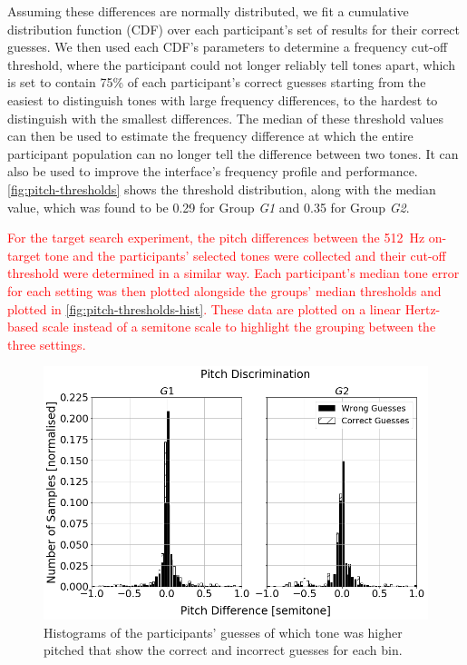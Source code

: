 \documentclass[acmsmall]{acmart}
\newcommand\hl[1]{\textcolor{red}{#1}}
\begin{document}
Assuming these differences are normally distributed, we fit a cumulative distribution function (CDF) over each participant's set of results for their correct guesses.
We then used each CDF's parameters to determine a frequency cut-off threshold, where the participant could not longer reliably tell tones apart, which is set to contain 75\% of each participant's correct guesses starting from the easiest to distinguish tones with large frequency differences, to the hardest to distinguish with the smallest differences. 
The median of these threshold values can then be used to estimate the frequency difference at which the entire participant population can no longer tell the difference between two tones. 
It can also be used to improve the interface's frequency profile and performance. 
\cref{fig:pitch-thresholds} shows the threshold distribution, along with the median value, which was found to be 0.29 for Group \textit{G1} and 0.35 for Group \textit{G2}. 

\hl{For the target search experiment, the pitch differences between the \SI{512}{\hertz} on-target tone and the participants' selected tones were collected and their cut-off threshold were determined in a similar way.
Each participant's median tone error for each setting was then plotted alongside the groups' median thresholds and plotted in \cref{fig:pitch-thresholds-hist}.
These data are plotted on a linear Hertz-based scale instead of a semitone scale to highlight the grouping between the three settings.}{}

\begin{figure}
  \centering
  \includegraphics[width=0.8\columnwidth]{figures/pitch_discrimination.png}
  \caption{Histograms of the participants' guesses of which tone was higher pitched that show the correct and incorrect guesses for each bin. }\label{fig:pitch-discrimination}
\end{figure}
\end{document}
